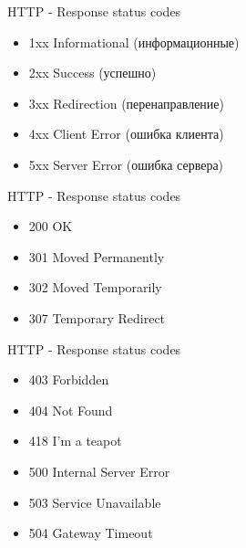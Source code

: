 \begin{frame}{HTTP - Response status codes}
            \begin{center}
                 \begin{itemize}
                     \item 1xx Informational (информационные)
                     \item 2xx Success (успешно)
                     \item 3xx Redirection (перенаправление)
                     \item 4xx Client Error (ошибка клиента)
                     \item 5xx Server Error (ошибка сервера)
                 \end{itemize}
            \end{center}
\end{frame}

\begin{frame}{HTTP - Response status codes}
            \begin{center}
                 \begin{itemize}
                     \item 200 OK
                     \item 301 Moved Permanently
                     \item 302 Moved Temporarily
                     \item 307 Temporary Redirect
                 \end{itemize}
            \end{center}
\end{frame}

\begin{frame}{HTTP - Response status codes}
            \begin{center}
                 \begin{itemize}
                     \item 403 Forbidden
                     \item 404 Not Found
                     \item 418 I'm a teapot
                     \item 500 Internal Server Error
                     \item 503 Service Unavailable
                     \item 504 Gateway Timeout
                 \end{itemize}
            \end{center}
\end{frame}